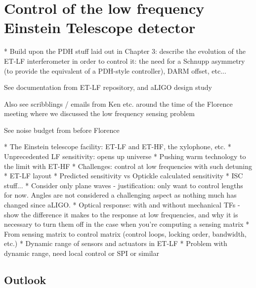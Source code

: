 \chapter{Control of the low frequency Einstein Telescope detector}
\label{c:et-lf-control}

  * Build upon the PDH stuff laid out in Chapter 3: describe the evolution of the ET-LF interferometer in order to control it: the need for a Schnupp asymmetry (to provide the equivalent of a PDH-style controller), DARM offset, etc...
  
  See documentation from ET-LF repository, and aLIGO design study
  
  Also see scribblings / emails from Ken etc. around the time of the Florence meeting where we discussed the low frequency sensing problem
  
  See noise budget from before Florence

  * The Einstein telescope facility: ET-LF and ET-HF, the xylophone, etc.
    * Unprecedented LF sensitivity: opens up universe
    * Pushing warm technology to the limit with ET-HF
    * Challenges: control at low frequencies with such detuning
  * ET-LF layout
  * Predicted sensitivity vs Optickle calculated sensitivity
  * ISC stuff...
    * Consider only plane waves - justification: only want to control lengths for now. Angles are not considered a challenging aspect as nothing much has changed since aLIGO.
    * Optical response: with and without mechanical TFs - show the difference it makes to the response at low frequencies, and why it is necessary to turn them off in the case when you're computing a sensing matrix
    * From sensing matrix to control matrix (control loops, locking order, bandwidth, etc.)
    * Dynamic range of sensors and actuators in ET-LF
      * Problem with dynamic range, need local control or SPI or similar

\section{Outlook}